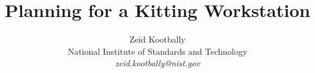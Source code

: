 \title{Planning for a Kitting Workstation}
\author{Zeid Kootbally\\ National Institute of Standards and Technology\\
        \emph{zeid.kootbally{@}nist.gov}}
\date{} 